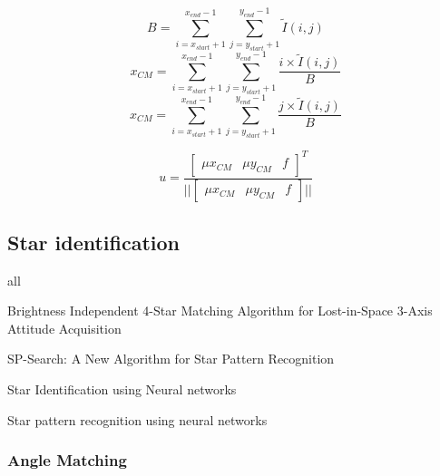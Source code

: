 \documentclass[12pt,a4paper,oneside]{article}
\begin{document}
\begin{equation}
B = \sum_{i=x_{start}+1}^{x_{end}-1}\sum_{j=y_{start}+1}^{y_{end}-1}\tilde{I}(i,j)
\end{equation}
\begin{equation}
x_{CM} = \sum_{i=x_{start}+1}^{x_{end}-1}\sum_{j=y_{start}+1}^{y_{end}-1}\frac{i \times \tilde{I}(i,j)}{B}
\end{equation}
\begin{equation}
x_{CM} = \sum_{i=x_{start}+1}^{x_{end}-1}\sum_{j=y_{start}+1}^{y_{end}-1}\frac{j \times \tilde{I}(i,j)}{B}
\end{equation}

\begin{equation}
u = \frac{
\begin{bmatrix}
\mu x_{CM} & \mu y_{CM} & f
\end{bmatrix}
^T}
{||
\begin{bmatrix}
\mu x_{CM} & \mu y_{CM} & f
\end{bmatrix}
||}
\end{equation}

\subsection{Star identification}
all \citet{spratling2009survey}\par
Brightness Independent 4-Star Matching Algorithm for Lost-in-Space 3-Axis Attitude Acquisition\citet{dong2006brightness} \par
SP-Search: A New Algorithm for Star Pattern Recognition \citet{mortari1999sp} \par
Star Identification using Neural networks \citet{miri2012star} \citet{lindbladstar} \par
Star pattern recognition using neural networks \citet{li2003star} \par


\subsubsection{Angle Matching}
\end{document}
